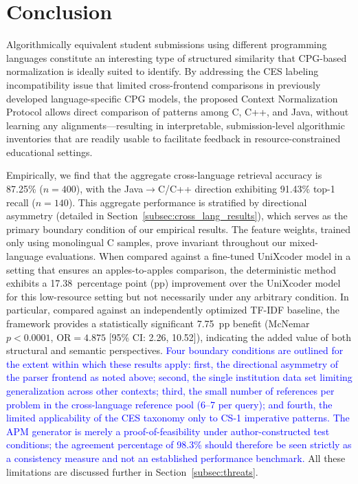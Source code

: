 \section{Conclusion}
\label{sec:conclusion}

Algorithmically equivalent student submissions using different programming languages constitute an interesting type of structured similarity that CPG-based normalization is ideally suited to identify. By addressing the CES labeling incompatibility issue that limited cross-frontend comparisons in previously developed language-specific CPG models, the proposed Context Normalization Protocol allows direct comparison of patterns among C, C++, and Java, without learning any alignments---resulting in interpretable, submission-level algorithmic inventories that are readily usable to facilitate feedback in resource-constrained educational settings.

Empirically, we find that the aggregate cross-language retrieval accuracy is 87.25\% ($n=400$), with the Java$\rightarrow$C/C++ direction exhibiting 91.43\% top-1 recall ($n=140$). This aggregate performance is stratified by directional asymmetry (detailed in Section~\ref{subsec:cross_lang_results}), which serves as the primary boundary condition of our empirical results. The feature weights, trained only using monolingual C samples, prove invariant throughout our mixed-language evaluations. When compared against a fine-tuned UniXcoder model in a setting that ensures an apples-to-apples comparison, the deterministic method exhibits a 17.38~percentage point (pp) improvement over the UniXcoder model for this low-resource setting but not necessarily under any arbitrary condition. In particular, compared against an independently optimized TF-IDF baseline, the framework provides a statistically significant 7.75~pp benefit (McNemar $p{<}0.0001$, OR$=4.875$ [95\% CI: 2.26, 10.52]), indicating the added value of both structural and semantic perspectives.
\textcolor{blue}{Four boundary conditions are outlined for the extent within which these results apply: first, the directional asymmetry of the parser frontend as noted above; second, the single institution data set limiting generalization across other contexts; third, the small number of references per problem in the cross-language reference pool (6--7 per query); and fourth, the limited applicability of the CES taxonomy only to CS-1 imperative patterns.} \textcolor{blue}{The APM generator is merely a proof-of-feasibility under author-constructed test conditions; the agreement percentage of 98.3\% should therefore be seen strictly as a consistency measure and not an established performance benchmark.} All these limitations are discussed further in Section~\ref{subsec:threats}.

